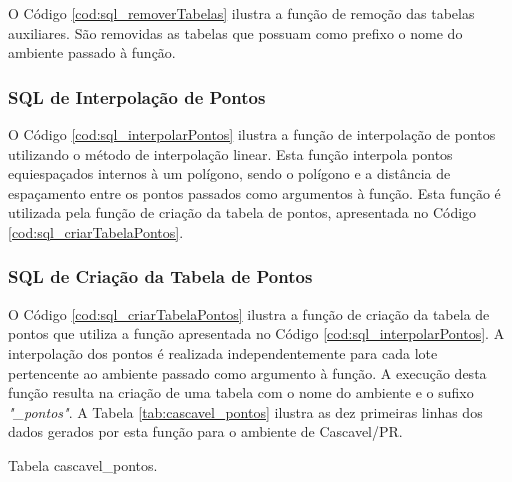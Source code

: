 O Código \ref{cod:sql_removerTabelas} ilustra a função de remoção das tabelas auxiliares. São removidas as tabelas que possuam como prefixo o nome do ambiente passado à função. 



\subsubsection{SQL de Interpolação de Pontos}

O Código \ref{cod:sql_interpolarPontos} ilustra a função de interpolação de pontos utilizando o método de interpolação linear. Esta função interpola pontos equiespaçados internos à um polígono, sendo o polígono e a distância de espaçamento entre os pontos passados como argumentos à função. Esta função é utilizada pela função de criação da tabela de pontos, apresentada no Código \ref{cod:sql_criarTabelaPontos}. 



\subsubsection{SQL de Criação da Tabela de Pontos}

O Código \ref{cod:sql_criarTabelaPontos} ilustra a função de criação da tabela de pontos que utiliza a função apresentada no Código \ref{cod:sql_interpolarPontos}. A interpolação dos pontos é realizada independentemente para cada lote pertencente ao ambiente passado como argumento à função. A execução desta função resulta na criação de uma tabela com o nome do ambiente e o sufixo \textit{"\_pontos"}. A Tabela \ref{tab:cascavel_pontos} ilustra as dez primeiras linhas dos dados gerados por esta função para o ambiente de Cascavel/PR.



\begin{table}[H]
\centering
{}
\caption{Tabela cascavel\_pontos.}
\label{tab:cascavel_pontos}
\end{table}

